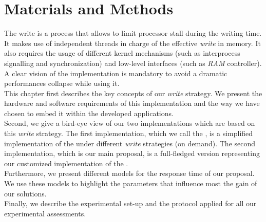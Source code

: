









\chapter{Materials and Methods}\label{chapter:materialAndMethod}
	The \emph{\notationaio}\space write is a process that allows to limit processor stall during the \emph{\notationIO}\space writing time.   It makes use of independent threads in charge of the effective \emph{write} in memory.   It also requires the usage of different kernel mechanisms (such as interprocess signalling and synchronization) and low-level interfaces (such as \emph{RAM} controller).   A clear vision of the \notationaio\space implementation is mandatory to avoid a dramatic performances collapse while using it.\\

	This chapter first describes the key concepts of our \notationaio\space \emph{write} strategy.   We present the hardware and software requirements of this implementation and the way we have chosen to embed it within the developed applications.\\
	Second, we give a bird-eye view of our two implementations which are based on this \notationaio\space \emph{write} strategy.   The first implementation, which we call the \toolSimulationSoftware\space, is a simplified implementation of the \toolTargetSoftware\space under different \emph{write} strategies (on demand).   The second implementation, which is our main proposal, is a full-fledged version representing our customized implementation of the \toolTargetSoftware.\\
	Furthermore, we present different models for the response time of our proposal.   We use these models to highlight the parameters that influence most the gain of our solutions.\\
	Finally, we describe the experimental set-up and the protocol applied for all our experimental assessments.


